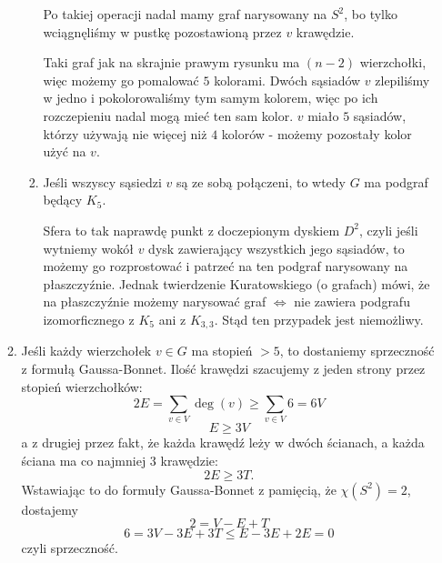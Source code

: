 \begin{enumerate}[label=\textbf{(\alph*)}]
\begin{enumerate}[label=\arabic*]
\begin{enumerate}
\begin{center}
\end{center}
        Po takiej operacji nadal mamy graf narysowany na $S^2$, bo tylko wciągnęliśmy w pustkę pozostawioną przez $v$ krawędzie.

        Taki graf jak na skrajnie prawym rysunku ma $(n-2)$ wierzchołki, więc możemy go pomalować $5$ kolorami. Dwóch sąsiadów $v$ zlepiliśmy w jedno i pokolorowaliśmy tym samym kolorem, więc po ich rozczepieniu nadal mogą mieć ten sam kolor. $v$ miało $5$ sąsiadów, którzy używają nie więcej niż $4$ kolorów - możemy pozostały kolor użyć na $v$.

      \item Jeśli wszyscy sąsiedzi $v$ są ze sobą połączeni, to wtedy $G$ ma podgraf będący $K_5$. 

        Sfera to tak naprawdę punkt z doczepionym dyskiem $D^2$, czyli jeśli wytniemy wokół $v$ dysk zawierający wszystkich jego sąsiadów, to możemy go rozprostować i patrzeć na ten podgraf narysowany na płaszczyźnie. Jednak twierdzenie Kuratowskiego (o grafach) mówi, że na płaszczyźnie możemy narysować graf $\iff$ nie zawiera podgrafu izomorficznego z $K_5$ ani z $K_{3,3}$. Stąd ten przypadek jest niemożliwy.
    \end{enumerate}
  \item Jeśli każdy wierzchołek $v\in G$ ma stopień $>5$, to dostaniemy sprzeczność z formułą Gaussa-Bonnet. Ilość krawędzi szacujemy z jeden strony przez stopień wierzchołków:
    $$2E=\sum_{v\in V}\deg(v)\geq\sum_{v\in V}6=6V$$
    $$E\geq 3V$$
    a z drugiej przez fakt, że każda krawędź leży w dwóch ścianach, a każda ściana ma co najmniej $3$ krawędzie:
    $$2E\geq 3T.$$
    Wstawiając to do formuły Gaussa-Bonnet z pamięcią, że $\chi(S^2)=2$, dostajemy
    $$2=V-E+T$$
    $$6=3V-3E+3T\leq E-3E+2E=0$$
    czyli sprzeczność.
    \end{enumerate}


\end{enumerate}
